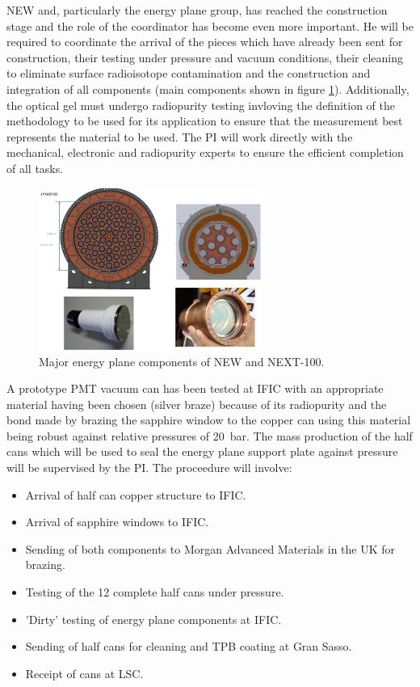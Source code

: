 \documentclass[a4paper,11pt,oneside]{article}
\begin{document}
NEW and, particularly the energy plane group, has reached the
construction stage and the role of the coordinator has become even
more important. He will be required to coordinate the arrival of the
pieces which have already been sent for construction, their testing
under pressure and vacuum conditions, their cleaning to eliminate
surface radioisotope contamination and the construction and
integration of all components (main components shown in figure \ref{fig:EPlane}). Additionally, the optical gel must
undergo radiopurity testing invloving the definition of the
methodology to be used for its application to ensure that the
measurement best represents the material to be used. The PI will work
directly with the mechanical, electronic and radiopurity experts to
ensure the efficient completion of all tasks.
\begin{figure}
  \begin{center}
    \includegraphics[width=0.65\textwidth]{img/EP.jpg}
  \end{center}
  \caption{Major energy plane components of NEW and NEXT-100.}
  \label{fig:EPlane}
\end{figure}
A prototype PMT vacuum can has been tested at IFIC with an appropriate
material having been chosen (silver braze) because of its radiopurity and the
bond made by brazing the sapphire window to the copper can using this
material being
robust against relative pressures of 20~bar. The mass production of
the half cans which will be used to seal the energy plane support
plate against pressure will be supervised by the PI. The proceedure
will involve:
\begin{itemize}
\item Arrival of half can copper structure to IFIC.
\item Arrival of sapphire windows to IFIC.
\item Sending of both components to Morgan Advanced Materials in the UK for brazing.
\item Testing of the 12 complete half cans under pressure.
\item 'Dirty' testing of energy plane components at IFIC.
\item Sending of half cans for cleaning and TPB coating at Gran Sasso.
\item Receipt of cans at LSC.
\end{itemize}
\end{document}

